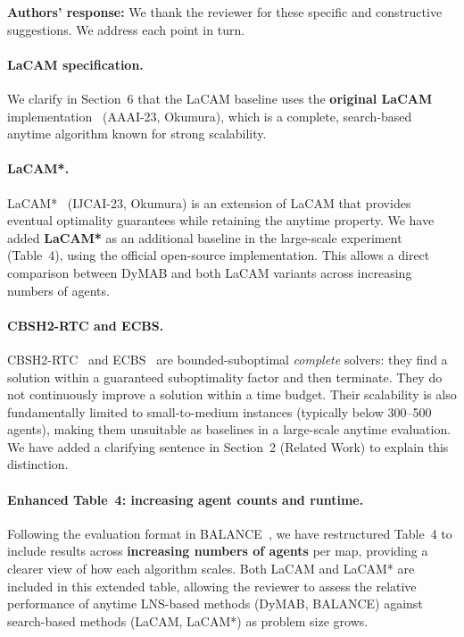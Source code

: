 \documentclass[review]{jair}
\begin{document}
\begin{authorbox}
\textbf{Authors' response:} We thank the reviewer for these specific and constructive suggestions. We address each point in turn.

\paragraph{LaCAM specification.}
We clarify in Section~6 that the LaCAM baseline uses the \textbf{original LaCAM} implementation~\citep{LaCam} (AAAI-23, Okumura), which is a complete, search-based anytime algorithm known for strong scalability.

\paragraph{LaCAM*.}
LaCAM*~\citep{LaCamStar} (IJCAI-23, Okumura) is an extension of LaCAM that provides eventual optimality guarantees while retaining the anytime property. We have added \textbf{LaCAM*} as an additional baseline in the large-scale experiment (Table~4), using the official open-source implementation. This allows a direct comparison between DyMAB and both LaCAM variants across increasing numbers of agents.

\paragraph{CBSH2-RTC and ECBS.}
CBSH2-RTC~\citep{CBSH2} and ECBS~\citep{ECBS} are bounded-suboptimal \emph{complete} solvers: they find a solution within a guaranteed suboptimality factor and then terminate. They do not continuously improve a solution within a time budget. Their scalability is also fundamentally limited to small-to-medium instances (typically below 300--500 agents), making them unsuitable as baselines in a large-scale anytime evaluation. We have added a clarifying sentence in Section~2 (Related Work) to explain this distinction.

\paragraph{Enhanced Table~4: increasing agent counts and runtime.}
Following the evaluation format in BALANCE~\citep{Balance}, we have restructured Table~4 to include results across \textbf{increasing numbers of agents} per map, providing a clearer view of how each algorithm scales. Both LaCAM and LaCAM* are included in this extended table, allowing the reviewer to assess the relative performance of anytime LNS-based methods (DyMAB, BALANCE) against search-based methods (LaCAM, LaCAM*) as problem size grows.
\end{authorbox}
\end{document}
